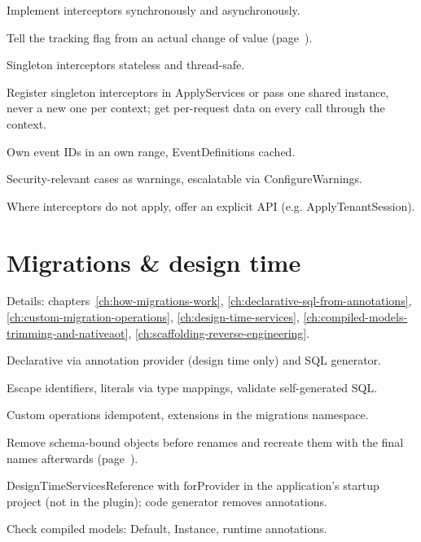 \begin{checklist}
  \item Implement interceptors synchronously and asynchronously.
  \item Tell the tracking flag from an actual change of value
    (page~\pageref{sec:tracking-flag-versus-value}).
  \item Singleton interceptors stateless and thread-safe.
  \item Register singleton interceptors in ApplyServices or pass one shared instance, never a
    new one per context; get per-request data on every call through the context.
  \item Own event IDs in an own range, EventDefinitions cached.
  \item Security-relevant cases as warnings, escalatable via ConfigureWarnings.
  \item Where interceptors do not apply, offer an explicit API (e.g. ApplyTenantSession).
\end{checklist}

\section{Migrations \& design time}

\noindent Details: chapters~\ref{ch:how-migrations-work}, \ref{ch:declarative-sql-from-annotations}, \ref{ch:custom-migration-operations}, \ref{ch:design-time-services}, \ref{ch:compiled-models-trimming-and-nativeaot}, \ref{ch:scaffolding-reverse-engineering}.

\begin{checklist}
  \item Declarative via annotation provider (design time only) and SQL generator.
  \item Escape identifiers, literals via type mappings, validate self-generated SQL.
  \item Custom operations idempotent, extensions in the migrations namespace.
  \item Remove schema-bound objects before renames and recreate them with the final names
    afterwards (page~\pageref{sec:sqlserver-schema-bound-changes}).
  \item DesignTimeServicesReference with forProvider in the application's startup project (not in the plugin); code generator removes annotations.
  \item Check compiled models: Default, Instance, runtime annotations.
\end{checklist}

